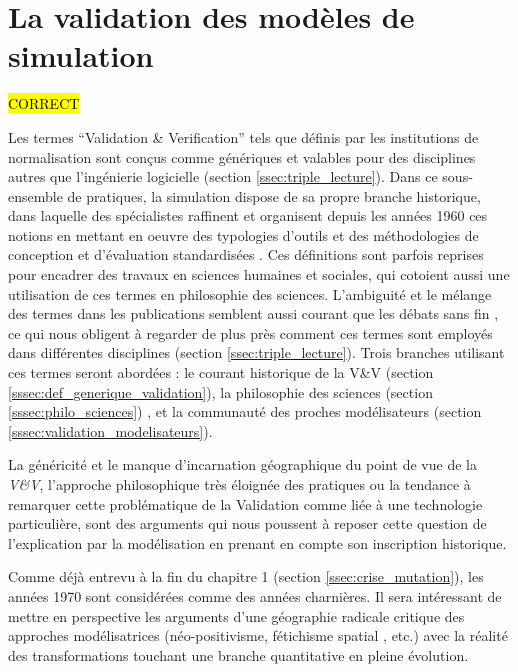 
\section{La validation des modèles de simulation}
\label{sec:constante_problematique}

\hl{CORRECT}

Les termes \foreignquote{english}{Validation \& Verification} tels que définis par les institutions de normalisation sont conçus comme génériques et valables pour des disciplines autres que l'ingénierie logicielle (section \ref{ssec:triple_lecture}). Dans ce sous-ensemble de pratiques, la simulation dispose de sa propre branche historique, dans laquelle des spécialistes raffinent et organisent depuis les années 1960 ces notions en mettant en oeuvre des typologies d'outils et des méthodologies de conception et d'évaluation standardisées \autocite{Nance2002}. Ces définitions sont parfois reprises pour encadrer des travaux en sciences humaines et sociales, qui cotoient aussi une utilisation de ces termes en philosophie des sciences. L'ambiguité et le mélange des termes dans les publications semblent aussi courant que les débats sans fin \autocites{David2009,Augusiak2014}, ce qui nous obligent à regarder de plus près comment ces termes sont employés dans différentes disciplines (section \ref{ssec:triple_lecture}). Trois branches utilisant ces termes seront abordées : le courant historique de la V\&V (section \ref{sssec:def_generique_validation}), la philosophie des sciences (section \ref{sssec:philo_sciences}) , et la communauté des proches modélisateurs (section \ref{sssec:validation_modelisateurs}).


La généricité et le manque d'incarnation géographique du point de vue de la \textit{V\&V}, l'approche philosophique très éloignée des pratiques ou la tendance à remarquer cette problématique de la Validation comme liée à une technologie particulière, sont des arguments qui nous poussent à reposer cette question de l'explication par la modélisation en prenant en compte son inscription historique.

Comme déjà entrevu à la fin du chapitre 1 (section \ref{ssec:crise_mutation}), les années 1970 sont considérées comme des années charnières. Il sera intéressant de mettre en perspective les arguments d'une géographie radicale critique des approches modélisatrices (néo-positivisme, fétichisme spatial , etc.) avec la réalité des transformations touchant une branche quantitative en pleine évolution.

